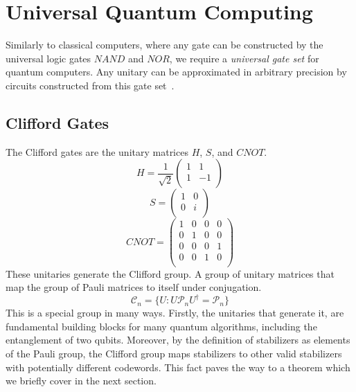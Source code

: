 \section{Universal Quantum Computing}\label{sec:uqc}

Similarly to classical computers, where any gate can be constructed by the universal logic gates $NAND$ and $NOR$, we require a \textit{universal gate set} for quantum computers. Any unitary can be approximated in arbitrary precision by circuits constructed from this gate set~\cite{nielsen00}.

\subsection{Clifford Gates}

The Clifford gates are the unitary matrices $H$, $S$, and $CNOT$.
\begin{equation}
    H = \frac{1}{\sqrt{2}}\begin{pmatrix}
        1 & 1 \\
        1 & -1 \\
    \end{pmatrix}
\end{equation}
\begin{equation}
    S = \begin{pmatrix}
        1 & 0 \\
        0 & i \\
    \end{pmatrix}
\end{equation}
\begin{equation}
    CNOT = \begin{pmatrix}
        1 & 0 & 0 & 0 \\
        0 & 1 & 0 & 0 \\
        0 & 0 & 0 & 1 \\
        0 & 0 & 1 & 0 \\
    \end{pmatrix}
\end{equation}
These unitaries generate the Clifford group. A group of unitary matrices that map the group of Pauli matrices to itself under conjugation.
\begin{equation}
    \mathcal{C}_n = \{U : U\mathcal{P}_nU^{\dagger} = \mathcal{P}_n\}
\end{equation}
This is a special group in many ways. Firstly, the unitaries that generate it, are fundamental building blocks for many quantum algorithms, including the entanglement of two qubits. Moreover, by the definition of stabilizers as elements of the Pauli group, the Clifford group maps stabilizers to other valid stabilizers with potentially different codewords. This fact paves the way to a theorem which we briefly cover in the next section. 

